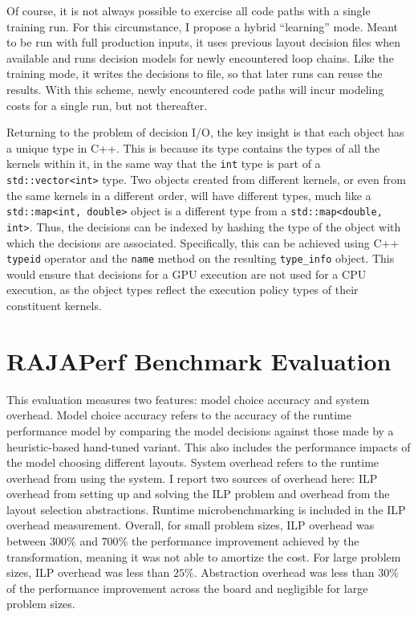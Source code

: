 Of course, it is not always possible to exercise all code paths with a single training run. 
For this circumstance, I propose a hybrid ``learning'' mode.
Meant to be run with full production inputs, it uses previous layout decision files when available and runs decision models for newly encountered loop chains.
Like the training mode, it writes the decisions to file, so that later runs can reuse the results.
With this scheme, newly encountered code paths will incur modeling costs for a single run, but not thereafter.

Returning to the problem of decision I/O, the key insight is that each \FormatDecisions{} object has a unique type in C++.
This is because its type contains the types of all the kernels within it, in the same way that the \verb.int. type is part of a \verb.std::vector<int>. type.
Two \FormatDecisions{} objects created from different kernels, or even from the same kernels in a different order, will have different types, much like a \verb.std::map<int, double>. object is a different type from a \verb.std::map<double, int>..
Thus, the decisions can be indexed by hashing the type of the \FormatDecisions{} object with which the decisions are associated.
Specifically, this can be achieved using C++ \verb.typeid. operator and the \verb.name. method on the resulting \verb.type_info. object.
This would ensure that decisions for a GPU execution are not used for a CPU execution, as the \FormatDecisions{} object types reflect the execution policy types of their constituent kernels.


\section{RAJAPerf Benchmark Evaluation}\label{fdEval}

This evaluation measures two features: model choice accuracy and system overhead.
Model choice accuracy refers to the accuracy of the runtime performance model by comparing the model decisions against those made by a heuristic-based hand-tuned variant.
This also includes the performance impacts of the model choosing different layouts.
System overhead refers to the runtime overhead from using the \FormatDecisions{} system.
I report two sources of overhead here: ILP overhead from setting up and solving the ILP problem and overhead from the layout selection abstractions.
Runtime microbenchmarking is included in the ILP overhead measurement.
Overall, for small problem sizes, ILP overhead was between $300\%$ and $700\%$ the performance improvement achieved by the transformation, meaning it was not able to amortize the cost.
For large problem sizes, ILP overhead was less than $25\%$.
Abstraction overhead was less than $30\%$ of the performance improvement across the board and negligible for large problem sizes.


